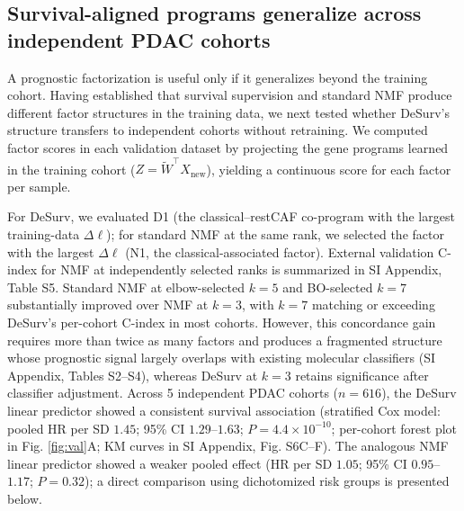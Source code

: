 \documentclass[9pt,twocolumn,twoside,]{pnas-new}
\begin{document}
\subsection*{Survival-aligned programs generalize across independent
PDAC
cohorts}\label{survival-aligned-programs-generalize-across-independent-pdac-cohorts}

A prognostic factorization is useful only if it generalizes beyond the
training cohort. Having established that survival supervision and
standard NMF produce different factor structures in the training data,
we next tested whether DeSurv's structure transfers to independent
cohorts without retraining. We computed factor scores in each validation
dataset by projecting the gene programs learned in the training cohort
(\(Z = \widetilde{W}^\top X_{\text{new}}\)), yielding a continuous score
for each factor per sample.

For DeSurv, we evaluated D1 (the classical--restCAF co-program with the
largest training-data \(\Delta\ell\)); for standard NMF at the same
rank, we selected the factor with the largest \(\Delta\ell\) (N1, the
classical-associated factor). External validation C-index for NMF at
independently selected ranks is summarized in SI Appendix, Table S5.
Standard NMF at elbow-selected \(k = 5\) and BO-selected \(k = 7\)
substantially improved over NMF at \(k = 3\), with \(k = 7\) matching or
exceeding DeSurv's per-cohort C-index in most cohorts. However, this
concordance gain requires more than twice as many factors and produces a
fragmented structure whose prognostic signal largely overlaps with
existing molecular classifiers (SI Appendix, Tables S2--S4), whereas
DeSurv at \(k = 3\) retains significance after classifier adjustment.
Across 5 independent PDAC cohorts (\(n = 616\)), the DeSurv linear
predictor showed a consistent survival association (stratified Cox
model: pooled HR per SD \(1.45\); 95\% CI \(1.29\)--\(1.63\);
\(P = \ensuremath{4.4\times 10^{-10}}\); per-cohort forest plot in Fig.
\ref{fig:val}A; KM curves in SI Appendix, Fig. S6C--F). The analogous
NMF linear predictor showed a weaker pooled effect (HR per SD \(1.05\);
95\% CI \(0.95\)--\(1.17\); \(P = 0.32\)); a direct comparison using
dichotomized risk groups is presented below.
\end{document}
